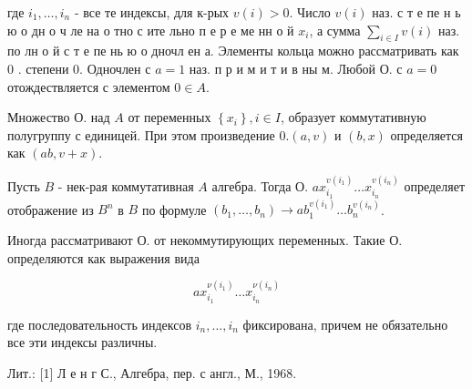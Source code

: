 \documentclass[10pt]{article}
\begin{document}
где $i_{1}, \ldots, i_{n}$ - все те индексы, для к-рых $v(i)>0$. Число $v(i)$ наз. с т е пе н ь ю о дн о ч ле на о тно с ите льно п е р е ме нн о й $x_{i}$, а сумма $\sum_{i \in I} v(i)$ наз. по лн о й с т е пе нь ю о дночл ен а. Элементы кольца можно рассматривать как 0 . степени 0. Одночлен с $a=1$ наз. п р и м и т и в ны м. Любой О. с $a=0$ отождествляется с элементом $0 \in A$.



Множество О. над $A$ от переменных $\left\{x_{i}\right\}, i \in I$, образует коммутативную полугруппу с единицей. При этом произведение $0 .(a, v)$ и $(b, x)$ определяется как $(a b, v+x)$.



Пусть $B$ - нек-рая коммутативная $A$ алгебра. Тогда О. $a x_{i_{1}}^{v\left(i_{1}\right)} \ldots x_{i_{n}}^{v\left(i_{n}\right)}$ определяет отображение из $B^{n}$ в $B$ по формуле $\left(b_{1}, \ldots, b_{n}\right) \rightarrow a b_{1}^{v\left(i_{1}\right)} \ldots b_{n}^{v\left(i_{n}\right)}$.



Иногда рассматривают О. от некоммутирующих переменных. Такие О. определяются как выражения вида



\[

a x_{i_{1}}^{\nu\left(i_{1}\right)} \ldots x_{i_{n}}^{\nu\left(i_{n}\right)}

\]



где последовательность индексов $i_{n}, \ldots, i_{n}$ фиксирована, причем не обязательно все эти индексы различны.



Лит.: [1] Л е н г С., Алгебра, пер. с англ., М., 1968.
\end{document}
